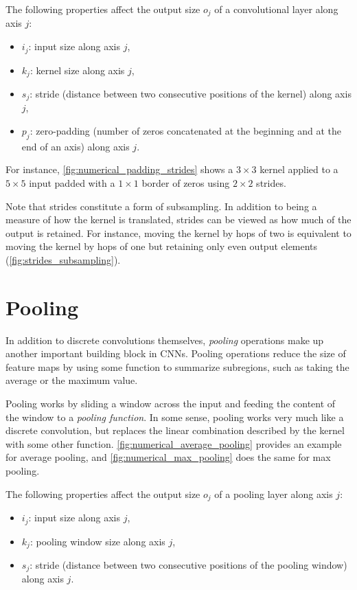 \documentclass{report}
\begin{document}
The following properties affect the output size $o_j$ of a convolutional layer
along axis $j$:

\begin{itemize}
    \item $i_j$: input size along axis $j$,
    \item $k_j$: kernel size along axis $j$,
    \item $s_j$: stride (distance between two consecutive positions of the
        kernel) along axis $j$,
    \item $p_j$: zero-padding (number of zeros concatenated at the beginning and
        at the end of an axis) along axis $j$.
\end{itemize}

For instance, \autoref{fig:numerical_padding_strides} shows a $3 \times 3$
kernel applied to a $5 \times 5$ input padded with a $1 \times 1$ border of
zeros using $2 \times 2$ strides.

Note that strides constitute a form of subsampling. In addition to being a
measure of how the kernel is translated, strides can be viewed as how much of
the output is retained. For instance, moving the kernel by hops of two is
equivalent to moving the kernel by hops of one but retaining only even output
elements (\autoref{fig:strides_subsampling}).

\section{Pooling}

In addition to discrete convolutions themselves, {\em pooling} operations
make up another important building block in CNNs. Pooling operations reduce
the size of feature maps by using some function to summarize subregions, such
as taking the average or the maximum value.

Pooling works by sliding a window across the input and feeding the content of
the window to a {\em pooling function}. In some sense, pooling works very much
like a discrete convolution, but replaces the linear combination described by
the kernel with some other function. \autoref{fig:numerical_average_pooling}
provides an example for average pooling, and \autoref{fig:numerical_max_pooling}
does the same for max pooling.

The following properties affect the output size $o_j$ of a pooling layer
along axis $j$:

\begin{itemize}
    \item $i_j$: input size along axis $j$,
    \item $k_j$: pooling window size along axis $j$,
    \item $s_j$: stride (distance between two consecutive positions of the
        pooling window) along axis $j$.
\end{itemize}
\end{document}
